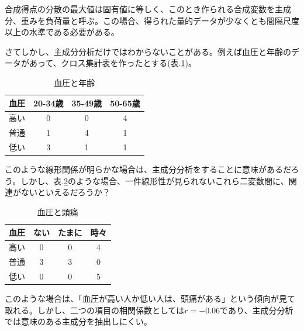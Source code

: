 \documentclass{ltjsbook}
\begin{document}
合成得点の分散の最大値は固有値に等しく、このとき作られる合成変数を主成分、重みを負荷量と呼ぶ。この場合、得られた量的データが少なくとも間隔尺度以上の水準である必要がある。

さてしかし、主成分分析だけではわからないことがある。例えば血圧と年齢のデータがあって、クロス集計表を作ったとする(表.\ref{BP})。
\begin{table}[h]
    \begin{center}
        \caption{血圧と年齢}
        \begin{tabular}{c|ccc}
            血圧 & 20-34歳 & 35-49歳 & 50-65歳 \\
            \hline
            高い & 0      & 0      & 4      \\
            普通 & 1      & 4      & 1      \\
            低い & 3      & 1      & 1      \\
        \end{tabular}
        \label{BP}
    \end{center}
\end{table}

このような線形関係が明らかな場合は、主成分分析をすることに意味があるだろう。しかし、表.\ref{BM}のような場合、一件線形性が見られないこれら二変数間に、関連がないといえるだろうか？
\begin{table}[h]
    \begin{center}
        \caption{血圧と頭痛}
        \begin{tabular}{c|ccc}
            血圧 & ない & たまに & 時々 \\
            \hline
            高い & 0  & 0   & 4  \\
            普通 & 3  & 3   & 0  \\
            低い & 0  & 0   & 5  \\
        \end{tabular}
        \label{BM}
    \end{center}
\end{table}

このような場合は、「血圧が高い人か低い人は、頭痛がある」という傾向が見て取れる。しかし、二つの項目の相関係数としては$r=-0.06$であり、主成分分析では意味のある主成分を抽出しにくい。
\end{document}
